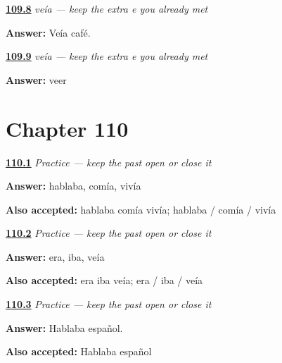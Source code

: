 \noindent\begin{minipage}[t]{\linewidth}
\raggedright
\hyperlink{review-ES-C16-ver-imperfecto-veo-veia}{\textbf{109.8}} \emph{veía — keep the extra e you already met}\par
\small \textbf{Answer:} Veía café.\par
\end{minipage}\par\medskip

\noindent\begin{minipage}[t]{\linewidth}
\raggedright
\hyperlink{review-ES-C16-ver-imperfecto-extra-e}{\textbf{109.9}} \emph{veía — keep the extra e you already met}\par
\small \textbf{Answer:} veer\par
\end{minipage}\par\medskip

\section*{Chapter 110}

\noindent\begin{minipage}[t]{\linewidth}
\raggedright
\hyperlink{review-ES-C16-practice-regular-yo-forms}{\textbf{110.1}} \emph{Practice — keep the past open or close it}\par
\small \textbf{Answer:} hablaba, comía, vivía\par
\footnotesize \textbf{Also accepted:} hablaba comía vivía; hablaba / comía / vivía
\end{minipage}\par\medskip

\noindent\begin{minipage}[t]{\linewidth}
\raggedright
\hyperlink{review-ES-C16-practice-short-yo-forms}{\textbf{110.2}} \emph{Practice — keep the past open or close it}\par
\small \textbf{Answer:} era, iba, veía\par
\footnotesize \textbf{Also accepted:} era iba veía; era / iba / veía
\end{minipage}\par\medskip

\noindent\begin{minipage}[t]{\linewidth}
\raggedright
\hyperlink{review-ES-C16-practice-hablaba-espanol}{\textbf{110.3}} \emph{Practice — keep the past open or close it}\par
\small \textbf{Answer:} Hablaba español.\par
\footnotesize \textbf{Also accepted:} Hablaba español
\end{minipage}\par\medskip


